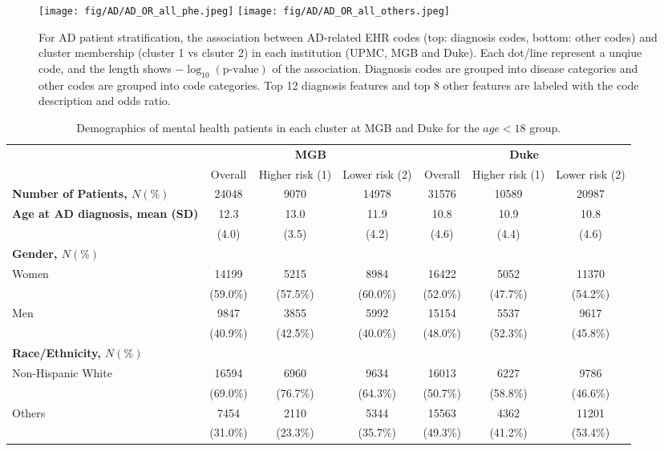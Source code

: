 \documentclass{article}
\begin{document}
\begin{figure}[p]
    \centering
    \texttt{[image: fig/AD/AD\_OR\_all\_phe.jpeg]}
    \texttt{[image: fig/AD/AD\_OR\_all\_others.jpeg]}
    \caption{For AD patient stratification, the association between AD-related EHR codes (top: diagnosis codes, bottom: other codes) and cluster membership (cluster 1 vs clsuter 2) in each institution (UPMC, MGB and Duke). Each dot/line represent a unqiue code, and the length shows $-\log_{10}(\text{p-value})$ of the association. Diagnosis codes are grouped into disease categories and other codes are grouped into code categories. Top 12 diagnosis features and top 8 other features are labeled with the code description and odds ratio. }
    \label{fig:AD_phewas}
\end{figure}

\begin{table}[H]
    \centering
    \scriptsize
    \begin{tabular}{l c c c c c c}
\toprule
& \multicolumn{3}{c}{\textbf{MGB}}&
\multicolumn{3}{c}{\textbf{Duke}}\\
\cmidrule(r){2-4}\cmidrule(l){5-7}
& Overall & Higher risk (1) & Lower risk (2) & Overall & Higher risk (1) & Lower risk (2)  \\
\bottomrule
\textbf{Number of Patients, $N(\%)$} & 24048 & 9070 & 14978 & 31576 & 10589 & 20987 \\
\bottomrule
\textbf{Age at AD diagnosis, mean (SD)} & 12.3 & 13.0 & 11.9 & 10.8 & 10.9 & 10.8 \\
 & (4.0) & (3.5) & (4.2) & (4.6) & (4.4) & (4.6) \\
\bottomrule
\textbf{Gender, $N(\%)$}\\
Women & 14199 & 5215 & 8984 & 16422 & 5052 & 11370 \\
 & (59.0\%) & (57.5\%) & (60.0\%) & (52.0\%) & (47.7\%) & (54.2\%) \\
Men & 9847 & 3855 & 5992 & 15154 & 5537 & 9617 \\
 & (40.9\%) & (42.5\%) & (40.0\%) & (48.0\%) & (52.3\%) & (45.8\%) \\
\bottomrule
\textbf{Race/Ethnicity, $N(\%)$} \\
Non-Hispanic White & 16594 & 6960 & 9634 & 16013 & 6227 & 9786 \\
 & (69.0\%) & (76.7\%) & (64.3\%) & (50.7\%) & (58.8\%) & (46.6\%)  \\
Others & 7454 & 2110 & 5344 & 15563 & 4362 & 11201 \\
 & (31.0\%) & (23.3\%) & (35.7\%) & (49.3\%) & (41.2\%) & (53.4\%) \\
\bottomrule
\end{tabular}
\caption{Demographics of mental health patients in each cluster at MGB and Duke for the $age < 18$ group.}
\label{tab:mental_demo_0-18}
\end{table}
\end{document}
